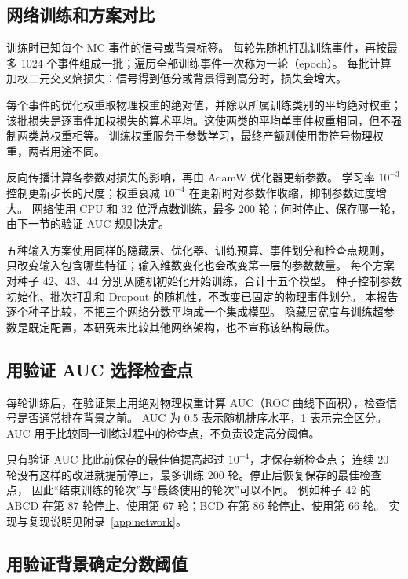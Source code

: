 \documentclass[11pt,a4paper,fontset=fandol,scheme=plain]{ctexart}
\begin{document}
\subsection{网络训练和方案对比}

训练时已知每个 MC 事件的信号或背景标签。
每轮先随机打乱训练事件，再按最多 1024 个事件组成一批；遍历全部训练事件一次称为一轮（epoch）。
每批计算加权二元交叉熵损失：信号得到低分或背景得到高分时，损失会增大。


每个事件的优化权重取物理权重的绝对值，并除以所属训练类别的平均绝对权重；
该批损失是逐事件加权损失的算术平均。这使两类的平均单事件权重相同，但不强制两类总权重相等。
训练权重服务于参数学习，最终产额则使用带符号物理权重，两者用途不同。

反向传播计算各参数对损失的影响，再由 AdamW 优化器更新参数。
学习率 $10^{-3}$ 控制更新步长的尺度；权重衰减 $10^{-4}$ 在更新时对参数作收缩，抑制参数过度增大。
网络使用 CPU 和 32 位浮点数训练，最多 200 轮；何时停止、保存哪一轮，由下一节的验证 AUC 规则决定。

五种输入方案使用同样的隐藏层、优化器、训练预算、事件划分和检查点规则，
只改变输入包含哪些特征；输入维数变化也会改变第一层的参数数量。
每个方案对种子 42、43、44 分别从随机初始化开始训练，合计十五个模型。
种子控制参数初始化、批次打乱和 Dropout 的随机性，不改变已固定的物理事件划分。
本报告逐个种子比较，不把三个网络分数平均成一个集成模型。
隐藏层宽度与训练超参数是既定配置，本研究未比较其他网络架构，也不宣称该结构最优。

\subsection{用验证 AUC 选择检查点}

每轮训练后，在验证集上用绝对物理权重计算 AUC（ROC 曲线下面积），检查信号是否通常排在背景之前。
AUC 为 0.5 表示随机排序水平，1 表示完全区分。AUC 用于比较同一训练过程中的检查点，不负责设定高分阈值。

只有验证 AUC 比此前保存的最佳值提高超过 $10^{-4}$，才保存新检查点；
连续 20 轮没有这样的改进就提前停止，最多训练 200 轮。停止后恢复保存的最佳检查点，
因此“结束训练的轮次”与“最终使用的轮次”可以不同。
例如种子 42 的 ABCD 在第 87 轮停止、使用第 67 轮；BCD 在第 86 轮停止、使用第 66 轮。
实现与复现说明见附录~\ref{app:network}。

\subsection{用验证背景确定分数阈值}
\end{document}
